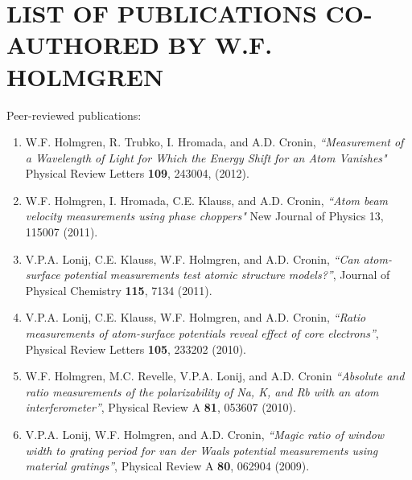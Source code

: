 \chapter{LIST OF PUBLICATIONS CO-AUTHORED BY W.F. HOLMGREN}
Peer-reviewed publications:
\begin{enumerate}

\item W.F. Holmgren, R. Trubko, I. Hromada, and A.D. Cronin, \emph{``Measurement of a Wavelength of Light for Which the Energy Shift for an Atom Vanishes"} Physical Review Letters {\bf109}, 243004, (2012). 

\item W.F. Holmgren, I. Hromada, C.E. Klauss, and A.D. Cronin, \emph{``Atom beam velocity measurements using phase choppers"} New Journal of Physics 13, 115007 (2011). 

\item V.P.A. Lonij, C.E. Klauss, W.F. Holmgren, and A.D. Cronin, \emph{``Can atom-surface potential measurements test atomic structure models?''}, Journal of Physical Chemistry {\bf115}, 7134 (2011).

 \item V.P.A. Lonij, C.E. Klauss, W.F. Holmgren, and A.D. Cronin, \emph{``Ratio measurements of atom-surface potentials reveal effect of core electrons''}, Physical Review Letters {\bf105}, 233202 (2010).

 \item W.F. Holmgren, M.C. Revelle, V.P.A. Lonij, and A.D. Cronin \emph{``Absolute and ratio measurements of the polarizability of Na, K, and Rb with an atom interferometer''}, Physical Review A {\bf81}, 053607 (2010).

\item	V.P.A. Lonij, W.F. Holmgren, and A.D. Cronin, \emph{``Magic ratio of window width to grating period for van der Waals potential measurements using material gratings''}, Physical Review A {\bf80}, 062904 (2009).



 
\end{enumerate}



